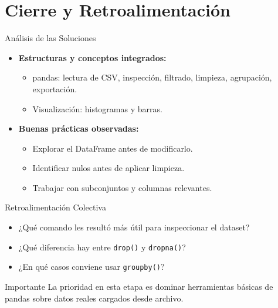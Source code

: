 \documentclass[10pt]{beamer}
\begin{document}
\section{Cierre y Retroalimentación}

\begin{frame}{Análisis de las Soluciones}
  \begin{itemize}
    \item \textbf{Estructuras y conceptos integrados:}
      \begin{itemize}
        \item pandas: lectura de CSV, inspección, filtrado, limpieza, agrupación, exportación.
        \item Visualización: histogramas y barras.
      \end{itemize}
    \item \textbf{Buenas prácticas observadas:}
      \begin{itemize}
        \item Explorar el DataFrame antes de modificarlo.
        \item Identificar nulos antes de aplicar limpieza.
        \item Trabajar con subconjuntos y columnas relevantes.
      \end{itemize}
  \end{itemize}
\end{frame}

\begin{frame}{Retroalimentación Colectiva}
  \begin{itemize}
    \item ¿Qué comando les resultó más útil para inspeccionar el dataset?
    \item ¿Qué diferencia hay entre \texttt{drop()} y \texttt{dropna()}?
    \item ¿En qué casos conviene usar \texttt{groupby()}?
  \end{itemize}
  \begin{alertblock}{Importante}
    La prioridad en esta etapa es dominar herramientas básicas de pandas sobre datos reales cargados desde archivo.
  \end{alertblock}
\end{frame}

\end{document}
